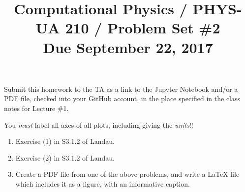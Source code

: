 \documentclass[11pt, preprint]{aastex}
\begin{document}
\title{\bf Computational Physics / PHYS-UA 210 / Problem Set \#2
\\ Due September 22, 2017 }

Submit this homework to the TA as a link to the Jupyter Notebook
and/or a PDF file, checked into your GitHub account, in the place
specified in the class notes for Lecture \#1.

You {\it must} label all axes of all plots, including giving the {\it
  units}!!

\begin{enumerate}

  \item Exercise (1) in S3.1.2 of Landau.

  \item Exercise (2) in S3.1.2 of Landau.

  \item Create a PDF file from one of the above problems, and write a
    LaTeX file which includes it as a figure, with an informative
    caption.

\end{enumerate}
\end{document}
